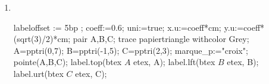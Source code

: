 \begin{exercice*}
\begin{changemargin}{0mm}{-15mm}
\begin{multicols}{2}
\begin{enumerate}
\begin{Geometrie}[CoinHD={(4u,4u)}]
                    pair A,B,C;
                    trace papiertrianglepointe;
                    A=pptri(2,2);
                    B=pptri(-1,5);
                    C=pptri(2,4);
                    marque_p:="croix";
                    pointe(A,B,C);
                    label.llft(btex $A$ etex, A);
                    label.ulft(btex $B$ etex, B);
                    label.urt(btex $C$ etex, C);
                \end{Geometrie}
                \item \phantom{rrr}\\
                \begin{Geometrie}[CoinHD={(4u,4u)}]
                    labeloffset := 5bp ;
                    coeff:=0.6;
                    uni:=true;
                    x.u:=coeff*cm;
                    y.u:=coeff*(sqrt(3)/2)*cm;
                    pair A,B,C;
                    trace papiertriangle withcolor Grey;
                    A=pptri(0,7);
                    B=pptri(-1,5);
                    C=pptri(2,3);
                    marque_p:="croix";
                    pointe(A,B,C);
                    label.top(btex $A$ etex, A);
                    label.lft(btex $B$ etex, B);
                    label.urt(btex $C$ etex, C);
                \end{Geometrie}
            \end{enumerate}
        \end{multicols}    
    \end{changemargin}
\end{exercice*}
